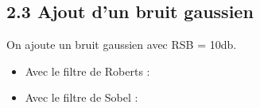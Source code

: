 \documentclass{article}
\begin{document}
\subsection*{2.3 Ajout d'un bruit gaussien}
On ajoute un bruit gaussien avec RSB = 10db.
\begin{itemize}\renewcommand{\labelitemi}{$\bullet$}
	\item Avec le filtre de Roberts :
	
	\item Avec le filtre de Sobel :
	
\end{itemize}
\end{document}
